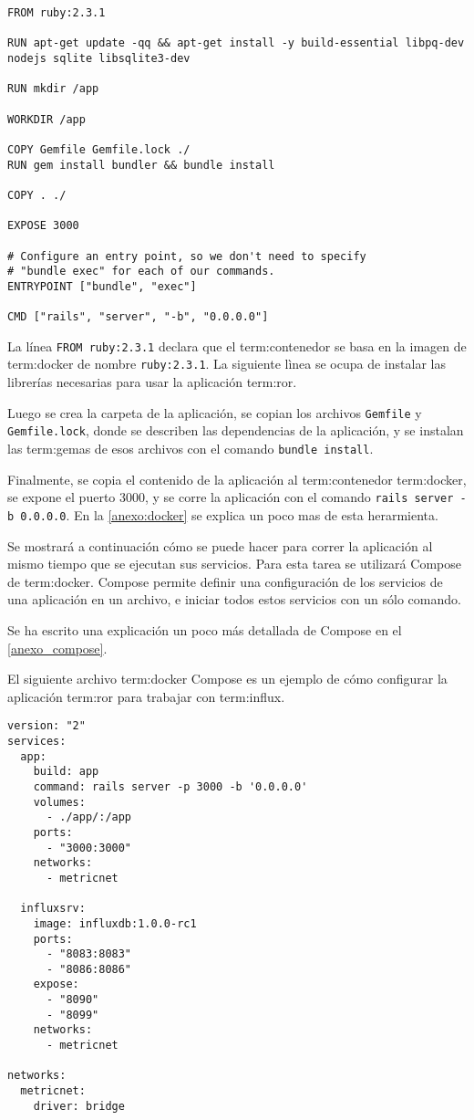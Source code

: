 \begin{lstlisting}
FROM ruby:2.3.1

RUN apt-get update -qq && apt-get install -y build-essential libpq-dev nodejs sqlite libsqlite3-dev

RUN mkdir /app

WORKDIR /app

COPY Gemfile Gemfile.lock ./
RUN gem install bundler && bundle install

COPY . ./

EXPOSE 3000

# Configure an entry point, so we don't need to specify
# "bundle exec" for each of our commands.
ENTRYPOINT ["bundle", "exec"]

CMD ["rails", "server", "-b", "0.0.0.0"]
\end{lstlisting}

La línea \lstinline{FROM ruby:2.3.1} declara que el \gls{term:contenedor} se
basa en la imagen de \gls{term:docker} de nombre \lstinline{ruby:2.3.1}. La
siguiente lìnea se ocupa de instalar las librerías necesarias para usar la
aplicación \gls{term:ror}.

Luego se crea la carpeta de la aplicación, se copian los archivos
\lstinline{Gemfile} y \lstinline{Gemfile.lock}, donde se describen las
dependencias de la aplicación, y se instalan las \glspl{term:gema} de esos
archivos con el comando \lstinline{bundle install}.

Finalmente, se copia el contenido de la aplicación al \gls{term:contenedor}
\gls{term:docker}, se expone el puerto 3000, y se corre la aplicación con el
comando \lstinline{rails server -b 0.0.0.0}. En la \autoref{anexo:docker}
se explica un poco mas de esta herarmienta.

Se mostrará a continuación cómo se puede hacer para correr la aplicación al
mismo tiempo que se ejecutan sus servicios. Para esta tarea se utilizará
Compose de \gls{term:docker}. Compose permite definir una
configuración de los servicios de una aplicación en un archivo, e iniciar todos
estos servicios con un sólo comando.

Se ha escrito una explicación un poco más detallada de Compose en el
\autoref{anexo_compose}.

El siguiente archivo \gls{term:docker} Compose es un ejemplo de cómo configurar
la aplicación \gls{term:ror} para trabajar con \gls{term:influx}.

\begin{lstlisting}
version: "2"
services:
  app:
    build: app
    command: rails server -p 3000 -b '0.0.0.0'
    volumes:
      - ./app/:/app
    ports:
      - "3000:3000"
    networks:
      - metricnet

  influxsrv:
    image: influxdb:1.0.0-rc1
    ports:
      - "8083:8083"
      - "8086:8086"
    expose:
      - "8090"
      - "8099"
    networks:
      - metricnet

networks:
  metricnet:
    driver: bridge
\end{lstlisting}


